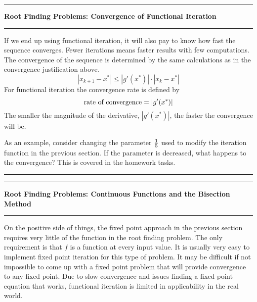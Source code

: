 \documentclass[10pt,fleqn]{article}
\begin{document}
\newpage
\vskip0.1in\hrule\vskip0.1in
\noindent
{\bf Root Finding Problems: Convergence of Functional Iteration}
\vskip0.1in\hrule\vskip0.1in
\noindent
If we end up using functional iteration, it will also pay to know how fast the
sequence converges. Fewer iterations means faster results with few computations.
The convergence of the sequence is determined by the same calculations as in
the convergence justification above.
$$
  | x_{k+1} - x^* | \leq | g'(x^*) | \cdot| x_k - x^* |
$$
For functional iteration the convergence rate is defined by
$$
  \makebox{rate of convergence} = | g'(x^*) | 
$$
The smaller the magnitude of the derivative, $|g'(x^*)|$, the faster the
convergence will be.

As an example, consider changing the parameter ${1\over 5}$ used to modify the
iteration function in the previous section. If the parameter is decreased, what
happens to the convergence? This is covered in the homework tasks.
\vskip0.1in\hrule\vskip0.1in
\newpage
\vskip0.1in\hrule\vskip0.1in
\noindent
{\bf Root Finding Problems: Continuous Functions and the Bisection Method}
\vskip0.1in\hrule\vskip0.1in
\noindent
On the positive side of things, the fixed point approach in the previous section
requires very little of the function in the root finding problem. The only
requirement is that $f$ is a function at every input value. It is usually very
easy to implement fixed point iteration for this type of problem. It may be
difficult if not impossible to come up with a fixed point problem that will
provide convergence to any fixed point. Due to slow convergence and issues
finding a fixed point equation that works, functional iteration is limited in
applicability in the real world.
\end{document}
